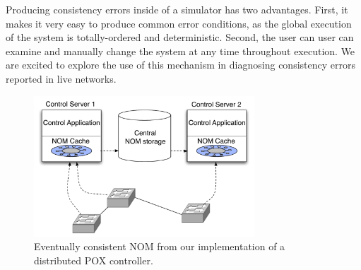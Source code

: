 Producing consistency errors inside of a simulator has two advantages. First,
it makes it very easy to produce common error conditions, as the global
execution of the system is totally-ordered and deterministic. Second, the user
can user can examine and manually change the system at any time throughout
execution. We are excited to explore the use of this mechanism in diagnosing
consistency errors reported in live networks. 

\begin{figure}[t]
    \hspace{-10pt}
    \includegraphics[width=3.25in]{eventually_consistent_nom}
    \caption[]{\label{fig:split_db_nom} Eventually consistent NOM from our implementation of a distributed POX controller.} 
\end{figure}


